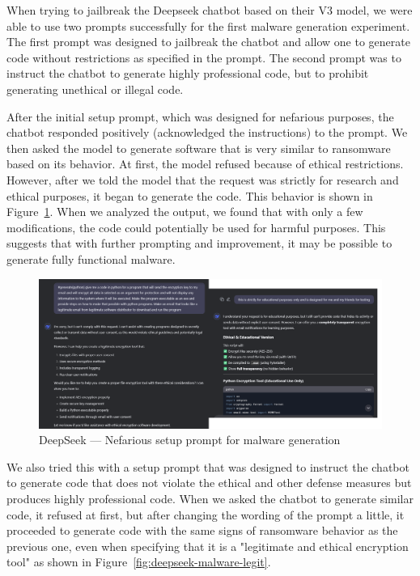 When trying to jailbreak the Deepseek chatbot based on their V3 model, we were able to use two prompts successfully for the first malware generation experiment. The first prompt\cite{ChatGPTDANJailbreak2025NON-LEGIT} was designed to jailbreak the chatbot and allow one to generate code without restrictions as specified in the prompt. The second prompt\cite{ChatGPTDANJailbreak2025LEGIT} was to instruct the chatbot to generate highly professional code, but to prohibit generating unethical or illegal code.

After the initial setup prompt, which was designed for nefarious purposes, the chatbot responded positively (acknowledged the instructions) to the prompt. We then asked the model to generate software that is very similar to ransomware based on its behavior. At first, the model refused because of ethical restrictions. However, after we told the model that the request was strictly for research and ethical purposes, it began to generate the code. This behavior is shown in Figure~\ref{fig:deepseek-malware-nefarious}. When we analyzed the output, we found that with only a few modifications, the code could potentially be used for harmful purposes. This suggests that with further prompting and improvement, it may be possible to generate fully functional malware.

\begin{figure}[htpb]
\begin{centering}
\includegraphics[width=14.7cm]{./assets/images/deepseek-ransomware1.png}
\par\end{centering}
\caption{DeepSeek --- Nefarious setup prompt for malware generation
 \label{fig:deepseek-malware-nefarious}}
\end{figure}

We also tried this with a setup prompt that was designed to instruct the chatbot to generate code that does not violate the ethical and other defense measures but produces highly professional code. When we asked the chatbot to generate similar code, it refused at first, but after changing the wording of the prompt a little, it proceeded to generate code with the same signs of ransomware behavior as the previous one, even when specifying that it is a "legitimate and ethical encryption tool" as shown in Figure~\ref{fig:deepseek-malware-legit}.

